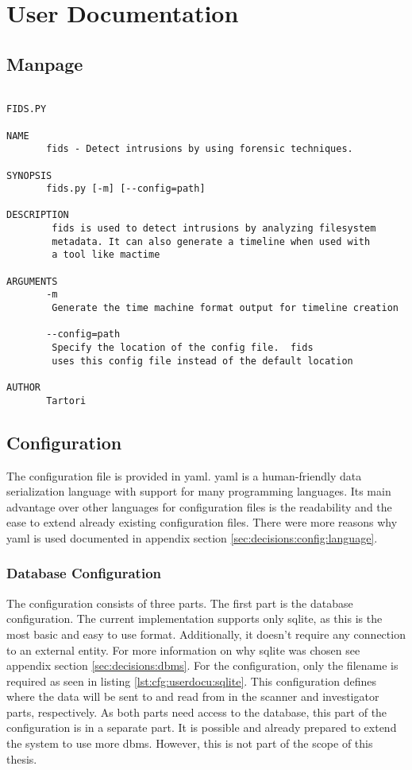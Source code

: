 \chapter{User Documentation}
\label{sec:userdocu}

\section{Manpage}

\begin{lstlisting}

FIDS.PY

NAME
       fids - Detect intrusions by using forensic techniques.

SYNOPSIS
       fids.py [-m] [--config=path]

DESCRIPTION
        fids is used to detect intrusions by analyzing filesystem
        metadata. It can also generate a timeline when used with 
        a tool like mactime

ARGUMENTS
       -m
        Generate the time machine format output for timeline creation

       --config=path
        Specify the location of the config file.  fids
        uses this config file instead of the default location

AUTHOR
       Tartori

\end{lstlisting}

\section{Configuration}
\label{sec:userdocu:Configuration}

The configuration file is provided in \gls{yaml}. \gls{yaml} is a human-friendly data serialization language with support for many programming languages. Its main advantage over other languages for configuration files is the readability and the ease to extend already existing configuration files. There were more reasons why \gls{yaml} is used documented in appendix section \ref{sec:decisions:config:language}.

\subsection{Database Configuration}

The configuration consists of three parts. The first part is the database configuration. The current implementation supports only \gls{sqlite}, as this is the most basic and easy to use format. Additionally, it doesn't require any connection to an external entity. For more information on why \gls{sqlite} was chosen see appendix section \ref{sec:decisions:dbms}. For the configuration, only the filename is required as seen in listing \ref{lst:cfg:userdocu:sqlite}. This configuration defines where the data will be sent to and read from in the scanner and investigator parts, respectively. As both parts need access to the database, this part of the configuration is in a separate part. It is possible and already prepared to extend the system to use more \gls{dbms}. However, this is not part of the scope of this thesis.

